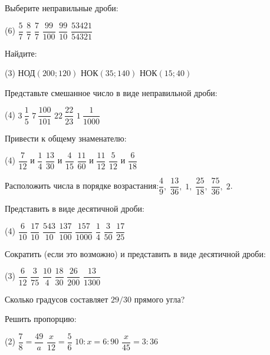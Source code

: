 
\begin{exam}
	\begin{listofex}
	\item Выберите неправильные дроби:
	\begin{tasks}(6)
		\task \( \dfrac{5}{7} \)
		\task \( \dfrac{8}{7} \)
		\task \( \dfrac{7}{7} \)
		\task \( \dfrac{99}{100} \)
		\task \( \dfrac{99}{10} \)
		\task \( \dfrac{53421}{54321} \)
	\end{tasks}
	\item Найдите:
	\begin{tasks}(3)
		\task НОД\( (200; 120) \)
		\task НОК\( (35; 140) \)
		\task НОК\( (15; 40) \)
	\end{tasks}
	\item Представьте смешанное число в виде неправильной дроби:
	\begin{tasks}(4)
		\task \( 3\:\dfrac{1}{5} \)
		\task \( 7\:\dfrac{100}{101} \)
		\task \( 22\:\dfrac{22}{23} \)
		\task \( 1\:\dfrac{1}{1000} \)
	\end{tasks}
	\item Привести к общему знаменателю:
	\begin{tasks}(4)
		\task \( \dfrac{7}{12} \) и \( \dfrac{1}{4} \)
		\task \( \dfrac{13}{30} \) и \( \dfrac{4}{15} \)
		\task \( \dfrac{11}{60} \) и \( \dfrac{11}{12} \)
		\task \( \dfrac{5}{12} \) и \( \dfrac{6}{18} \)
	\end{tasks}
	\item Расположить числа в порядке возрастания:\quad\( \dfrac{4}{9},\;\dfrac{13}{36},\;1,\;\dfrac{25}{18},\;\dfrac{75}{36},\;2 \).
	\item Представить в виде десятичной дроби:
	\begin{tasks}(4)
		\task \( \dfrac{6}{10} \)
		\task \( \dfrac{17}{10} \)
		\task \( \dfrac{543}{10} \)
		\task \( \dfrac{137}{100} \)
		\task \( \dfrac{157}{1000} \)
		\task \( \dfrac{1}{4} \)
		\task \( \dfrac{3}{50} \)
		\task \( \dfrac{17}{25} \)
	\end{tasks}
	\item Сократить (если это возможно) и представить в виде десятичной дроби:
	\begin{tasks}(3)
		\task \( \dfrac{6}{12} \)
		\task \( \dfrac{3}{75} \)
		\task \( \dfrac{10}{4} \)
		\task \( \dfrac{18}{30} \)
		\task \( \dfrac{26}{200} \)
		\task \( \dfrac{13}{1300} \)
	\end{tasks}
	\item Сколько градусов составляет \( 29/30 \) прямого угла?
	\item Решить пропорцию:
	\begin{tasks}(2)
		\task \( \dfrac{7}{8}=\dfrac{49}{a} \)
		\task \( \dfrac{x}{12}=\dfrac{5}{6} \)
		\task \( 10:x=6:90 \)
		\task \( \dfrac{x}{45}=3:36 \)
	\end{tasks}
	\end{listofex}
\end{exam}
